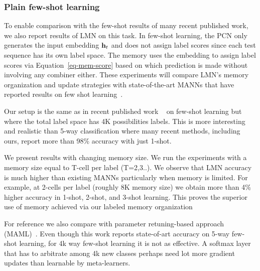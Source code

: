 \documentclass[letterpaper]{article} %
\newcommand{\vek}[1]{{\bf {#1}}}
\newcommand{\vh}{{\vek{h}}}
\begin{document}




\subsubsection{Plain few-shot learning}
To enable comparison with the few-shot results of many recent published work, we also report results of LMN on this task.
%
In few-shot learning, the PCN only generates the input embedding $\vh_t$ and does not assign label scores since each test sequence has its own label space. The memory uses the embedding to assign label scores via Equation~\ref{eq-mem-score} based on which prediction is made without involving any combiner either.
These experiments will compare LMN's memory organization and update strategies with state-of-the-art MANNs that have reported results on few shot learning~\cite{kaiser2017}.

Our setup is the same as in recent published work ~  on few-shot learning but where the total label space has 4K possibilities labels.  This is more interesting and realistic than 5-way classification where many recent methods, including ours, report more than 98\% accuracy with just 1-shot.

We present results with changing memory size. We run the experiments with a memory size equal to T-cell per label (T=2,3..).  We observe that LMN accuracy is much higher than existing MANNs particularly when memory is limited. For example, at 2-cells per label (roughly 8K memory size) we obtain more than 4\% higher accuracy in 1-shot, 2-shot, and 3-shot learning. This proves the superior use of memory achieved via our labeled memory organization

For reference we also compare with parameter retuning-based approach (MAML)~.  Even though this work reports state-of-art accuracy on 5-way few-shot learning, for 4k way few-shot learning it is not as effective.  A softmax layer that has to arbitrate among 4k new classes perhaps need lot more gradient updates than learnable by meta-learners.
\end{document}
